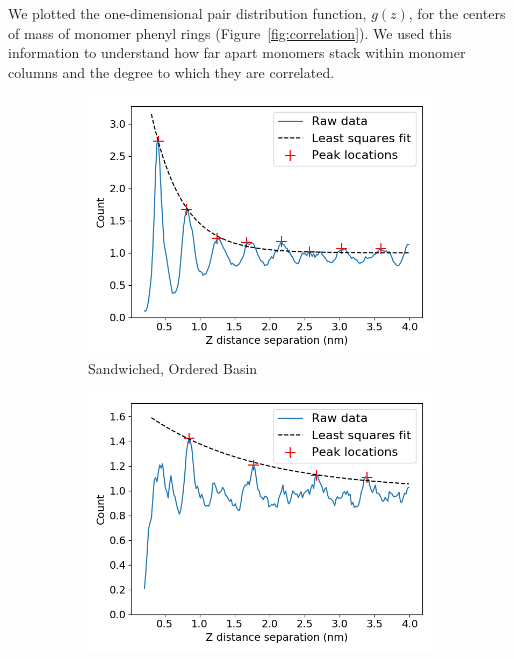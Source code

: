 \documentclass[journal=jpcbfk,manusciprt=article]{achemso}
\begin{document}
  We plotted the one-dimensional pair distribution function, $g(z)$, for the centers
  of mass of monomer phenyl rings (Figure~\ref{fig:correlation}). We used this 
  information to understand how far apart monomers stack within monomer columns and
  the degree to which they are correlated.
  
  \begin{figure}
  \centering
  \begin{subfigure}{0.45\textwidth}
  \centering
  \includegraphics[width=\textwidth]{z_correlation_sandwich.png}
  \caption{Sandwiched, Ordered Basin}\label{fig:z_correlation_sandwich}
  \end{subfigure}  
  \begin{subfigure}{0.45\textwidth}
  \centering
  \includegraphics[width=\textwidth]{z_correlation_offset.png}

\end{subfigure}
\end{figure}
\end{document}
